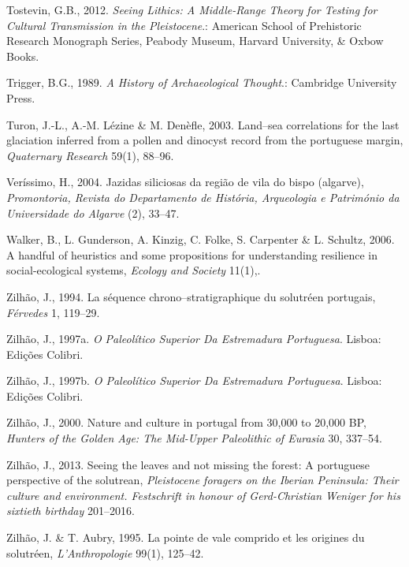 \documentclass[12pt,twoside]{reedthesis}
\begin{document}
\leavevmode\hypertarget{ref-tostevin2012}{}%
Tostevin, G.B., 2012. \emph{Seeing Lithics: A Middle-Range Theory for Testing for Cultural Transmission in the Pleistocene}.: American School of Prehistoric Research Monograph Series, Peabody Museum, Harvard University, \& Oxbow Books.

\leavevmode\hypertarget{ref-trigger1989}{}%
Trigger, B.G., 1989. \emph{A History of Archaeological Thought}.: Cambridge University Press.

\leavevmode\hypertarget{ref-turon2003}{}%
Turon, J.-L., A.-M. Lézine \& M. Denèfle, 2003. Land--sea correlations for the last glaciation inferred from a pollen and dinocyst record from the portuguese margin, \emph{Quaternary Research} 59(1), 88--96.

\leavevmode\hypertarget{ref-verissimo2004}{}%
Veríssimo, H., 2004. Jazidas siliciosas da região de vila do bispo (algarve), \emph{Promontoria, Revista do Departamento de História, Arqueologia e Património da Universidade do Algarve} (2), 33--47.

\leavevmode\hypertarget{ref-walker2006}{}%
Walker, B., L. Gunderson, A. Kinzig, C. Folke, S. Carpenter \& L. Schultz, 2006. A handful of heuristics and some propositions for understanding resilience in social-ecological systems, \emph{Ecology and Society} 11(1),.

\leavevmode\hypertarget{ref-zilhao1994}{}%
Zilhão, J., 1994. La séquence chrono--stratigraphique du solutréen portugais, \emph{Férvedes} 1, 119--29.

\leavevmode\hypertarget{ref-zilhao1997}{}%
Zilhão, J., 1997a. \emph{O Paleolítico Superior Da Estremadura Portuguesa}. Lisboa: Edições Colibri.

\leavevmode\hypertarget{ref-zilhao1997b}{}%
Zilhão, J., 1997b. \emph{O Paleolítico Superior Da Estremadura Portuguesa}. Lisboa: Edições Colibri.

\leavevmode\hypertarget{ref-zilhao2000}{}%
Zilhão, J., 2000. Nature and culture in portugal from 30,000 to 20,000 BP, \emph{Hunters of the Golden Age: The Mid-Upper Paleolithic of Eurasia} 30, 337--54.

\leavevmode\hypertarget{ref-zilhao2013}{}%
Zilhão, J., 2013. Seeing the leaves and not missing the forest: A portuguese perspective of the solutrean, \emph{Pleistocene foragers on the Iberian Peninsula: Their culture and environment. Festschrift in honour of Gerd-Christian Weniger for his sixtieth birthday} 201--2016.

\leavevmode\hypertarget{ref-zilhaoetal1995}{}%
Zilhão, J. \& T. Aubry, 1995. La pointe de vale comprido et les origines du solutréen, \emph{L'Anthropologie} 99(1), 125--42.
\end{document}
